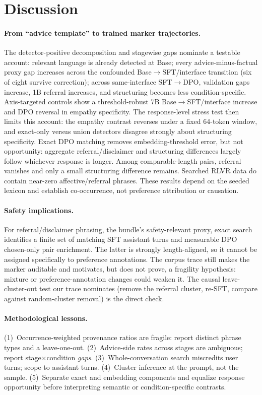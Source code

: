 \documentclass[11pt]{article}
\begin{document}
\section{Discussion}

\paragraph{From ``advice template'' to trained marker trajectories.} The
detector-positive decomposition and stagewise gaps nominate a testable account:
relevant language is already detected at Base; every advice-minus-factual proxy
gap increases across the confounded Base$\to$SFT/interface transition (six of
eight survive correction); across same-interface SFT$\to$DPO, validation gaps
increase, 1B referral increases, and structuring becomes less condition-specific.
Axis-targeted controls show a threshold-robust 7B Base$\to$SFT/interface
increase and DPO reversal in empathy specificity. The response-level stress test
then limits this account: the empathy contrast reverses under a fixed 64-token
window, and exact-only versus union detectors disagree strongly about
structuring specificity. Exact DPO matching removes embedding-threshold error,
but not opportunity: aggregate referral/disclaimer and structuring differences
largely follow whichever response is longer. Among comparable-length pairs,
referral vanishes and only a small structuring difference remains. Searched RLVR
data do contain near-zero affective/referral phrases. These results depend on
the seeded lexicon and establish co-occurrence, not preference attribution or
causation.

\paragraph{Safety implications.} For referral/disclaimer phrasing, the
bundle's safety-relevant proxy, exact search identifies a finite set of
matching SFT assistant turns and measurable DPO chosen-only pair enrichment.
The latter is strongly length-aligned, so it cannot be assigned specifically to
preference annotations. The corpus trace still makes the marker auditable and
motivates, but does not prove, a fragility
hypothesis: mixture or preference-annotation changes could weaken it. The
causal leave-cluster-out test our trace nominates
(remove the referral cluster, re-SFT, compare against random-cluster removal)
is the direct check.

\paragraph{Methodological lessons.} (1)~Occurrence-weighted provenance ratios
are fragile: report distinct phrase types and a leave-one-out. (2)~Advice-side
rates across stages are ambiguous; report stage$\times$condition \emph{gaps}.
(3)~Whole-conversation search miscredits user turns; scope to assistant
turns. (4)~Cluster inference at the prompt, not the sample. (5)~Separate exact
and embedding components and equalize response opportunity before interpreting
semantic or condition-specific contrasts.
\end{document}
